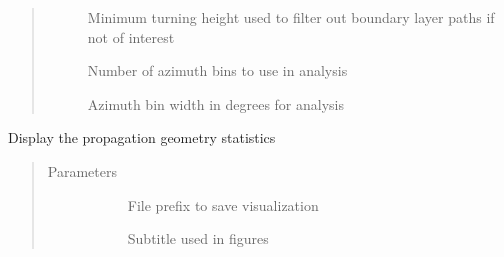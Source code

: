 \documentclass[letterpaper,10pt,english]{sphinxmanual}
\begin{document}
\begin{fulllineitems}
\begin{fulllineitems}
\begin{quote}
\begin{description}
\begin{description}
\item[{}] \leavevmode
\sphinxAtStartPar
Minimum turning height used to filter out boundary layer paths if not of interest

\item[{}] \leavevmode
\sphinxAtStartPar
Number of azimuth bins to use in analysis

\item[{}] \leavevmode
\sphinxAtStartPar
Azimuth bin width in degrees for analysis

\end{description}

\end{description}\end{quote}

\end{fulllineitems}


\begin{fulllineitems}
\label{\detokenize{stochprop.propagation:stochprop.propagation.PathGeometryModel.display}}
\sphinxAtStartPar
Display the propagation geometry statistics
\begin{quote}\begin{description}
\item[{Parameters}] \leavevmode\begin{description}
\item[{}] \leavevmode
\sphinxAtStartPar
File prefix to save visualization

\item[{}] \leavevmode
\sphinxAtStartPar
Subtitle used in figures

\end{description}

\end{description}\end{quote}

\end{fulllineitems}


\end{fulllineitems}
\end{document}

